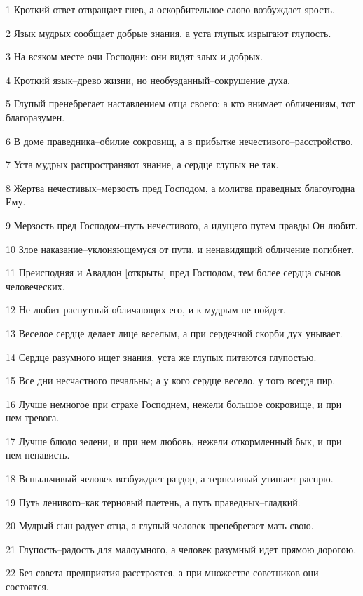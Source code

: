 \par 1 Кроткий ответ отвращает гнев, а оскорбительное слово возбуждает ярость.
\par 2 Язык мудрых сообщает добрые знания, а уста глупых изрыгают глупость.
\par 3 На всяком месте очи Господни: они видят злых и добрых.
\par 4 Кроткий язык--древо жизни, но необузданный--сокрушение духа.
\par 5 Глупый пренебрегает наставлением отца своего; а кто внимает обличениям, тот благоразумен.
\par 6 В доме праведника--обилие сокровищ, а в прибытке нечестивого--расстройство.
\par 7 Уста мудрых распространяют знание, а сердце глупых не так.
\par 8 Жертва нечестивых--мерзость пред Господом, а молитва праведных благоугодна Ему.
\par 9 Мерзость пред Господом--путь нечестивого, а идущего путем правды Он любит.
\par 10 Злое наказание--уклоняющемуся от пути, и ненавидящий обличение погибнет.
\par 11 Преисподняя и Аваддон [открыты] пред Господом, тем более сердца сынов человеческих.
\par 12 Не любит распутный обличающих его, и к мудрым не пойдет.
\par 13 Веселое сердце делает лице веселым, а при сердечной скорби дух унывает.
\par 14 Сердце разумного ищет знания, уста же глупых питаются глупостью.
\par 15 Все дни несчастного печальны; а у кого сердце весело, у того всегда пир.
\par 16 Лучше немногое при страхе Господнем, нежели большое сокровище, и при нем тревога.
\par 17 Лучше блюдо зелени, и при нем любовь, нежели откормленный бык, и при нем ненависть.
\par 18 Вспыльчивый человек возбуждает раздор, а терпеливый утишает распрю.
\par 19 Путь ленивого--как терновый плетень, а путь праведных--гладкий.
\par 20 Мудрый сын радует отца, а глупый человек пренебрегает мать свою.
\par 21 Глупость--радость для малоумного, а человек разумный идет прямою дорогою.
\par 22 Без совета предприятия расстроятся, а при множестве советников они состоятся.
